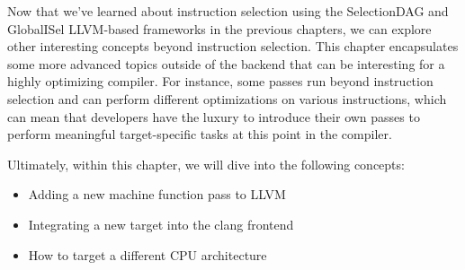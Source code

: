 Now that we’ve learned about instruction selection using the SelectionDAG and GlobalISel LLVM-based frameworks in the previous chapters, we can explore other interesting concepts beyond instruction selection. This chapter encapsulates some more advanced topics outside of the backend that can be interesting for a highly optimizing compiler. For instance, some passes run beyond instruction selection and can perform different optimizations on various instructions, which can mean that developers have the luxury to introduce their own passes to perform meaningful target-specific tasks at this point in the compiler.

Ultimately, within this chapter, we will dive into the following concepts:

\begin{itemize}
\item
Adding a new machine function pass to LLVM

\item
Integrating a new target into the clang frontend

\item
How to target a different CPU architecture
\end{itemize}


















